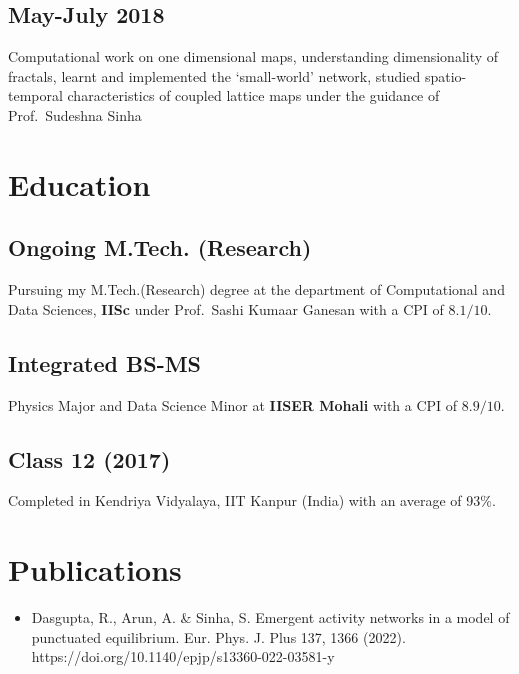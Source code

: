 \documentclass{article}
\begin{document}

\subsection{May-July 2018}

Computational work on one dimensional maps,
understanding dimensionality of fractals,
learnt and implemented the `small-world' network,
studied spatio-temporal characteristics
of coupled lattice maps
under the guidance of Prof.~Sudeshna Sinha

\section{Education}

\subsection{Ongoing M.Tech. (Research)}
Pursuing my M.Tech.(Research) degree at the
department of Computational and Data Sciences, {\bf IISc}
under Prof.~Sashi Kumaar Ganesan
with a CPI of $8.1 / 10$.

\subsection{Integrated BS-MS}
Physics Major and Data Science Minor
at {\bf IISER Mohali} with a CPI of $8.9 / 10$.

\subsection{Class 12 (2017)} 
Completed in Kendriya Vidyalaya, IIT Kanpur (India)
with an average of 93\%.

\section{Publications}
\begin{itemize}
	\item Dasgupta, R., Arun, A. \& Sinha, S. Emergent activity networks in a model of punctuated equilibrium. Eur. Phys. J. Plus 137, 1366 (2022). https://doi.org/10.1140/epjp/s13360-022-03581-y
\end{itemize}
\end{document}
